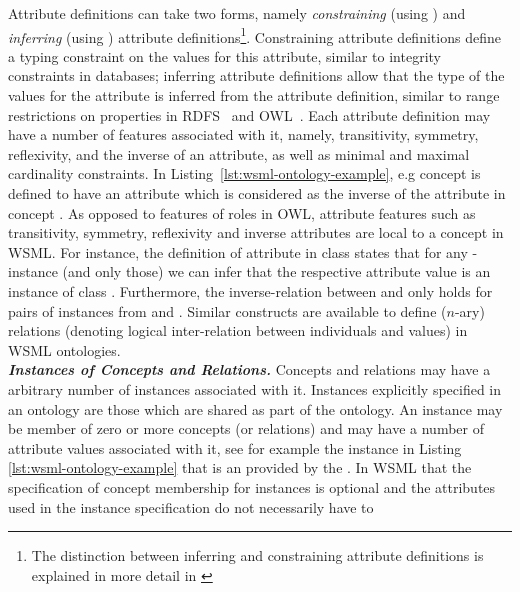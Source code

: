 Attribute definitions can take two forms, namely \emph{constraining}
(using ) and \emph{inferring} (using
) attribute definitions\footnote{The distinction
  between inferring and constraining attribute definitions is
  explained in more detail in \cite[Section
  2]{Bruijn+PolleresETAL-:05}}. Constraining attribute definitions
define a typing constraint on the values for this attribute, similar
to integrity constraints in databases; inferring attribute
definitions allow that the type of the values for the attribute is
inferred from the attribute definition, similar to range
restrictions on properties in
RDFS~\cite{Brickley+Guha-VocaDescLang:03} and
OWL~\cite{Dean+Schreiber-OntoLangRefe:04}.  Each attribute
definition may have a number of features associated with it, namely,
transitivity, symmetry, reflexivity, and the inverse of an
attribute, as well as minimal and maximal cardinality constraints.
In Listing~\ref{lst:wsml-ontology-example}, e.g concept 
is defined to have an attribute  which is
considered as the inverse of the attribute  in concept .
As opposed to features of roles in OWL, attribute features
such as transitivity, symmetry, reflexivity and inverse attributes are local
to a concept in WSML.
For instance, the definition of attribute  in
class  states that for any -instance (and only those) we
can infer that the respective attribute value is an instance of class
. Furthermore, the inverse-relation between
 and  only holds for pairs of
instances from  and .
Similar constructs are available to define ($n$-ary) relations (denoting
logical inter-relation between individuals and values) in WSML
ontologies.
\\ {\it \bfseries Instances of Concepts and Relations.}
Concepts and relations may have a arbitrary number of
instances associated with it. Instances explicitly specified in an
ontology are those which are shared as part of the ontology. An
instance may be member of zero or more concepts (or relations) and may have a
number of attribute values associated with it, see for example the
instance  in Listing
\ref{lst:wsml-ontology-example} that is an  provided by the .
In WSML that the specification of
concept membership for instances is optional and the attributes
used in the instance specification do not necessarily have to
